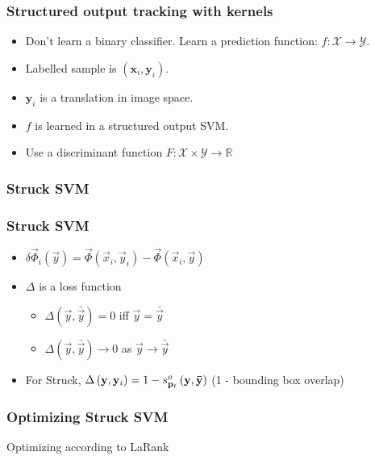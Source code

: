 
\begin{frame}
    \frametitle{Structured output tracking with kernels \cite{6126251}}
    \begin{itemize}
        \item Don't learn a binary classifier. Learn a prediction function: \(f : \mathcal{X} \rightarrow \mathcal{Y}\).
        \item Labelled sample is \((\mathbf{x}_i, \mathbf{y}_i)\).
        \item \(\mathbf{y}_i\) is a translation in image space.
        \item \(f\) is learned in a structured output SVM.
        \item Use a discriminant function \(F : \mathcal{X} \times \mathcal{Y} \to \mathbb{R}\)
            \struckDiscriminant
    \end{itemize}
\end{frame}

\begin{frame}
    \frametitle{Struck SVM}
    \struckEquation
\end{frame}

\begin{frame}
    \frametitle{Struck SVM}
    \begin{itemize}
        \item \(\delta \vec{\Phi}_i \left( \vec{y} \right) = \vec{\Phi} \left( \vec{x}_i, \vec{y}_i \right) - \vec{\Phi} \left( \vec{x}_i, \vec{y} \right)\)
        \item \(\Delta\) is a loss function
            \begin{itemize}
                \item \(\Delta \left(\vec{y}, \bar{\vec{y}} \right) = 0\) iff \(\vec{y} =
                    \bar{\vec{y}}\)
                \item \(\Delta \left(\vec{y}, \bar{\vec{y}} \right) \to 0\) as \(\vec{y} \to
                    \bar{\vec{y}}\)
            \end{itemize}
        \item For Struck, \(\Delta\left(\mathbf{y}, \mathbf{y}_i\right) = 1 - s_{\mathbf{p}_t}^o \left( \mathbf{y}, \mathbf{\bar{y}}
            \right) \) (1 - bounding box overlap)
    \end{itemize}
\end{frame}

\begin{frame}
    \frametitle{Optimizing Struck SVM}
    Optimizing according to LaRank \cite{Bordes:2007:SMS:1273496.1273508}
    \struckDualAlpha
\end{frame}


